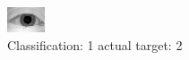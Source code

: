 \begin{figure}[h!]
\begin{center}
\includegraphics[width=0.60\columnwidth]{figures/ID965_class_1_target_2.png}
\end{center}
\caption{ Classification: 1 actual target: 2}
\label{fig:ID965_class_1_target_2}
\end{figure}
